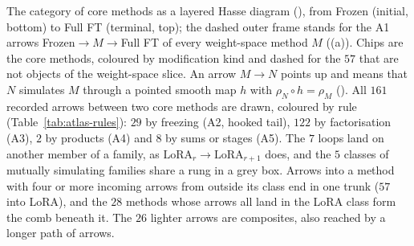 The category of core methods as a layered Hasse diagram (), from Frozen (initial, bottom) to Full FT (terminal, top); the dashed outer frame stands for the A1 arrows Frozen${}\to M\to{}$Full FT of every weight-space method $M$ ((a)). Chips are the \nCore{} core methods, coloured by modification kind and dashed for the $57$ that are not objects of the weight-space slice. An arrow $M\to N$ points up and means that $N$ simulates $M$ through a pointed smooth map $h$ with $\rho_N\circ h=\rho_M$ (). All $161$ recorded arrows between two core methods are drawn, coloured by rule (Table~\ref{tab:atlas-rules}): $29$ by freezing (A2, hooked tail), $122$ by factorisation (A3), $2$ by products (A4) and $8$ by sums or stages (A5). The $7$ loops land on another member of a family, as $\mathrm{LoRA}_r\to\mathrm{LoRA}_{r+1}$ does, and the $5$ classes of mutually simulating families share a rung in a grey box. Arrows into a method with four or more incoming arrows from outside its class end in one trunk ($57$ into LoRA), and the $28$ methods whose arrows all land in the LoRA class form the comb beneath it. The $26$ lighter arrows are composites, also reached by a longer path of arrows.
